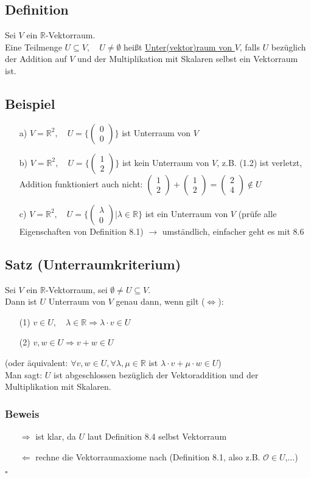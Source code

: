 \documentclass[12pt, titlepage]{article}
\newcommand{\R}{\mathds{R}}
\renewcommand{\vec}[1]{\left(\begin{array}{c}#1
	\end{array}\right)}
\renewcommand{\O}{\mathcal{O}}
\renewcommand{\>}{\rightarrow}
\renewcommand{\*}{\cdot}
\begin{document}
	\subsection{Definition}
	Sei $V$ ein $\R$-Vektorraum.\\
	Eine Teilmenge $U\subseteq V,\quad U\neq\emptyset$ heißt \underline{Unter(vektor)raum von $V$}, falls $U$ bezüglich der Addition auf $V$ und der Multiplikation mit Skalaren selbst ein Vektorraum ist.
	\subsection{Beispiel}
	\begin{itemize}
		\item[a)] $V=\R^2,\quad U=\{\vec{0\\0}\}$ ist Unterraum von $V$
		\item[b)] $V=\R^2,\quad U=\{\vec{1\\2}\}$ ist kein Unterraum von $V$, z.B. (1.2) ist verletzt, Addition funktioniert auch nicht: $\vec{1\\2}+\vec{1\\2}=\vec{2\\4}\notin U$
		\item[c)] $V=\R^2,\quad U=\{\vec{\lambda\\0}|\lambda\in\R\}$ ist ein Unterraum von $V$ (prüfe alle Eigenschaften von Definition 8.1) $\>$ umständlich, einfacher geht es mit 8.6
	\end{itemize}
	\subsection{Satz (Unterraumkriterium)}
	Sei $V$ ein $\R$-Vektorraum, sei $\emptyset\neq U\subseteq V$.\\
	Dann ist $U$ Unterraum von $V$ genau dann, wenn gilt ($\Leftrightarrow$):
	\begin{itemize}
		\item[(1)] $v\in U,\quad\lambda\in\R\Rightarrow\lambda\*v\in U$
		\item[(2)] $v,w\in U\Rightarrow v+w\in U$
	\end{itemize}
	(oder äquivalent: $\forall v,w\in U, \forall\lambda,\mu\in\R$ ist $\lambda\*v+\mu\*w\in U$)\\
	Man sagt: $U$ ist abgeschlossen bezüglich der Vektoraddition und der Multiplikation mit Skalaren.
	\subsubsection*{Beweis}
	\begin{itemize}
		\item[$\Rightarrow$] ist klar, da $U$ laut Definition 8.4 selbst Vektorraum
		\item[$\Leftarrow$] rechne die Vektorraumaxiome nach (Definition 8.1, also z.B. $\O\in U$,...)
	\end{itemize}
	\hfill$\square$
\end{document}
